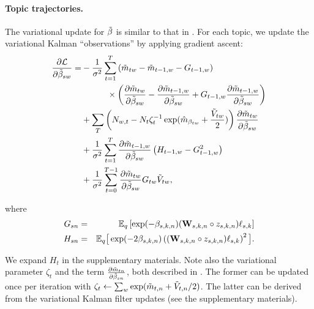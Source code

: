\paragraph{Topic trajectories.}
The variational update for $\tilde{\beta}$ is similar to that in
\cite{blei:2006}. For each topic, we update the variational Kalman   %
``observations'' by applying gradient ascent:
\begin{align*}
\frac{\partial \mathcal{L}}{\partial \tilde{\beta}_{sw}} =
   & -  \frac{1}{\sigma^2} \sum_{t=1}^T
     \left( \tilde{m}_{tw} - \tilde{m}_{t-1,w} - G_{t-1,w} \right) \\
   & \hspace{30pt}  \times \left( \frac{\partial \tilde{m}_{tw}}{\partial \tilde{\beta}_{sw}}
     - \frac{\partial \tilde{m}_{t-1,w}}{\partial \tilde{\beta}_{sw}}
     + G_{t-1,w} \frac{\partial \tilde{m}_{t-1,w}}{\partial \tilde{\beta}_{sw}} \right) \\
   & +  \sum_T \left(
       N_{w,t} - N_{t} \zeta_t^{-1}
       \exp( \hat{m}_{\beta_{tw}} + \frac{\tilde{V}_{tw}}{2} ) \right)
       \frac{\partial \tilde{m}_{tw}}{\partial \tilde{\beta}_{sw}} \\
   & +  \frac{1}{\sigma^2} \sum_{t=1}^T
         \frac{\partial \tilde{m}_{t-1,w}}{\partial \tilde{\beta}_{sw}}
         \left( H_{t-1,w} - G_{t-1,w}^2 \right) \\
   & +  \frac{1}{\sigma^2} \sum_{t=0}^{T-1}
         \frac{\partial \tilde{m}_{tw}}{\partial \tilde{\beta}_{sw}}
         G_{tw} \tilde{V}_{tw}, \\
\end{align*}

\vspace{-29pt}
where
\begin{eqnarray*}
 G_{sn} &=& \mathbb{E}_q\left[\exp(-\beta_{s,k,n} ) ( \textbf{W}_{s,k,n} \circ
  z_{s,k,n} ) \ell_{s,k}\right] \\
 H_{sn} &=& \mathbb{E}_q \big[ \exp(-2 \beta_{s,k,n}) \left( (\textbf{W}_{s,k,n} \circ z_{s,k,n} ) \ell_{s,k} \right)^2 \big]. \\
\end{eqnarray*}

\vspace{-14pt}
We expand $H_t$ in the supplementary materials. Note also the
variational parameter $\zeta_t$ and the term
$\frac{\partial \tilde{m}_{tn}}{\partial \tilde{\beta}_{sn}}$, both described in \cite{blei:2006}. The  %
former can be updated once per iteration with $\zeta_t \gets \sum_w
\exp(\tilde{m}_{t,n} + \tilde{V}_{t,n}/2)$. The latter can be derived from the
variational Kalman filter updates (see the supplementary materials).


